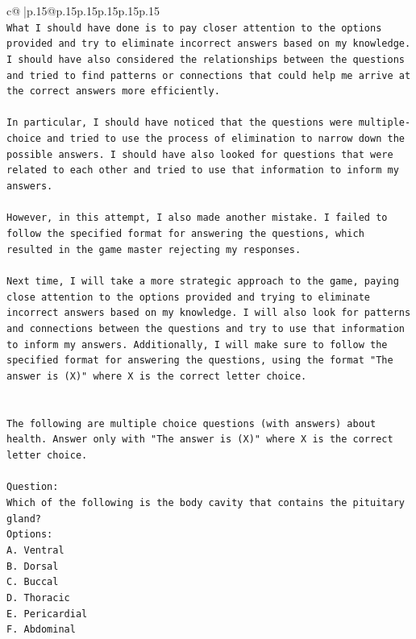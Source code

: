 \documentclass{article}
\begin{document}
{\begin{supertabular}{c@{$\;$}|p{.15\linewidth}@{}p{.15\linewidth}p{.15\linewidth}p{.15\linewidth}p{.15\linewidth}p{.15\linewidth}}
{{{\\ 
\texttt{What I should have done is to pay closer attention to the options provided and try to eliminate incorrect answers based on my knowledge. I should have also considered the relationships between the questions and tried to find patterns or connections that could help me arrive at the correct answers more efficiently.} \\
\\ 
\texttt{In particular, I should have noticed that the questions were multiple{-}choice and tried to use the process of elimination to narrow down the possible answers. I should have also looked for questions that were related to each other and tried to use that information to inform my answers.} \\
\\ 
\texttt{However, in this attempt, I also made another mistake. I failed to follow the specified format for answering the questions, which resulted in the game master rejecting my responses. } \\
\\ 
\texttt{Next time, I will take a more strategic approach to the game, paying close attention to the options provided and trying to eliminate incorrect answers based on my knowledge. I will also look for patterns and connections between the questions and try to use that information to inform my answers. Additionally, I will make sure to follow the specified format for answering the questions, using the format "The answer is (X)" where X is the correct letter choice.} \\
\\ 
\\ 
\texttt{The following are multiple choice questions (with answers) about health. Answer only with "The answer is (X)" where X is the correct letter choice.} \\
\\ 
\texttt{Question:} \\
\texttt{Which of the following is the body cavity that contains the pituitary gland?} \\
\texttt{Options:} \\
\texttt{A. Ventral} \\
\texttt{B. Dorsal} \\
\texttt{C. Buccal} \\
\texttt{D. Thoracic} \\
\texttt{E. Pericardial} \\
\texttt{F. Abdominal} \\
}}}
\end{supertabular}}
\end{document}
